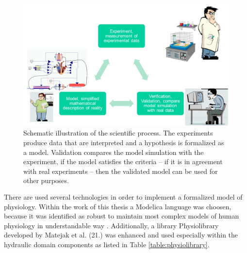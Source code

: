 \begin{figure}[ht]
    \centering
    \includegraphics[width=1\textwidth]{../chapter3/modeling.png}
    \caption{Schematic illustration of the scientific process. The experiments produce data that are interpreted and a hypothesis is formalized as a model. Validation compares the model simulation with the experiment, if the model satisfies the criteria -- if it is in agreement with real experiments -- then the validated model can be used for other purposes. 
    }
    \label{fig:modeling}
\end{figure}

There are used several technologies in order to implement a formalized model of physiology. Within the work of this thesis a Modelica language was choosen, because it was identified as robust to maintain most complex models of human physiology in understandable way \cite{Kofranek2011hummod}. Additionally, a library Physiolibrary developed by Matejak et al. (21.) %
was enhanced and used especially within the hydraulic domain components as listed in Table \ref{table:physiolibrary}. 

